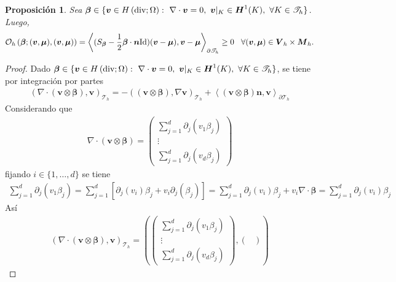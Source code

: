 \documentclass[10pt,a4paper]{report}
\newtheorem{prop}{Proposición}
\newcommand{\bs}{\boldsymbol}
\newcommand{\Th}{\mathscr{T}_{h}}
\newcommand{\Hdiv}{H\left(\textup{div};\Omega\right)}
\providecommand{\PI}[2]{\left\langle #1,#2  \right\rangle}
\providecommand{\Pii}[2]{\left( #1,#2  \right)}
\begin{document}
    \begin{prop}
    	Sea $\bs{\beta}\in\{\bs{v}\in\Hdiv:\ \nabla\cdot\bs{v}=0,\ \bs{v}|_{K}\in\bs{H}^{1}(K),\ \forall K\in\Th \}$. Luego,
    	\begin{align*}
    		\mathcal{O}_{h}\left(\bs{\beta};(\bs{v},\bs{\mu}),(\bs{v},\bs{\mu})\right) = \PI{(S_{\bs{\beta}}-\frac{1}{2}\bs{\beta}\cdot\bs{n}\textup{Id})(\bs{v}-\bs{\mu})}{\bs{v}-\bs{\mu}}_{\partial\Th} \geq 0 \hspace{3mm} \forall(\bs{v},\bs{\mu})\in\bs{V}_{h}\times\bs{M}_{h}.
    	\end{align*}
    \end{prop}
    \begin{proof}
    	Dado $\bs{\beta}\in\{\bs{v}\in\Hdiv:\ \nabla\cdot\bs{v}=0,\ \bs{v}|_{K}\in\bs{H}^{1}(K),\ \forall K\in\Th \}$, se tiene por integración por partes
    	\begin{align*}
    		\Pii{\nabla\cdot(\bs{v}\otimes\bs{\beta})}{\bs{v}}_{\Th} = -\Pii{(\bs{v}\otimes\bs{\beta})}{\nabla\bs{v}}_{\Th} + \PI{(\bs{v}\otimes\bs{\beta})\bs{n}}{\bs{v}}_{\partial\Th}
    	\end{align*}
        Considerando que
        \begin{align*}
        	\nabla\cdot(\bs{v}\otimes\bs{\beta}) = \begin{pmatrix}
        		\sum_{j=1}^{d}\partial_{j}(v_{1}\beta_{j})\\ 
        		\vdots\\ 
        		\sum_{j=1}^{d}\partial_{j}(v_{d}\beta_{j})
        	\end{pmatrix}
        \end{align*}
        fijando $i\in\{1,\dots,d\}$ se tiene
        \begin{align*}
        	\sum_{j=1}^{d}\partial_{j}(v_{1}\beta_{j}) = \sum_{j=1}^{d}\left[\partial_{j}(v_{i})\beta_{j} + v_{i}\partial_{j}(\beta_{j})\right] = \sum_{j=1}^{d}\partial_{j}(v_{i})\beta_{j} + v_{i}\nabla\cdot\bs{\beta} =  \sum_{j=1}^{d}\partial_{j}(v_{i})\beta_{j}
        \end{align*}
        Así
        \begin{align*}
        	\Pii{\nabla\cdot(\bs{v}\otimes\bs{\beta})}{\bs{v}}_{\Th} = \Pii{\begin{pmatrix}
        		\sum_{j=1}^{d}\partial_{j}(v_{1}\beta_{j})\\ 
        		\vdots\\ 
        		\sum_{j=1}^{d}\partial_{j}(v_{d}\beta_{j})
        	\end{pmatrix}}{\begin{pmatrix}

\end{pmatrix}}
\end{align*}
\end{proof}
\end{document}
